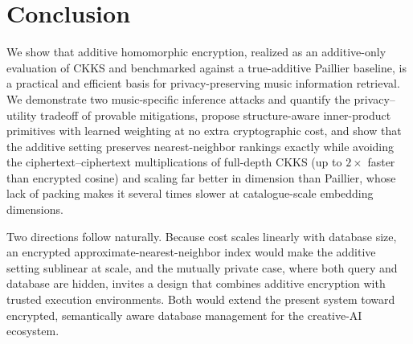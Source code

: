 \documentclass[sigconf,nonacm]{acmart}
\begin{document}
\section{Conclusion}
We show that additive homomorphic encryption, realized as an additive-only evaluation of CKKS and benchmarked against a true-additive Paillier baseline, is a practical and efficient basis for privacy-preserving music information retrieval. We demonstrate two music-specific inference attacks and quantify the privacy--utility tradeoff of provable mitigations, propose structure-aware inner-product primitives with learned weighting at no extra cryptographic cost, and show that the additive setting preserves nearest-neighbor rankings exactly while avoiding the ciphertext--ciphertext multiplications of full-depth CKKS (up to $2\times$ faster than encrypted cosine) and scaling far better in dimension than Paillier, whose lack of packing makes it several times slower at catalogue-scale embedding dimensions.

Two directions follow naturally. Because cost scales linearly with database size, an encrypted approximate-nearest-neighbor index would make the additive setting sublinear at scale, and the mutually private case, where both query and database are hidden, invites a design that combines additive encryption with trusted execution environments. Both would extend the present system toward encrypted, semantically aware database management for the creative-AI ecosystem.



\end{document}
